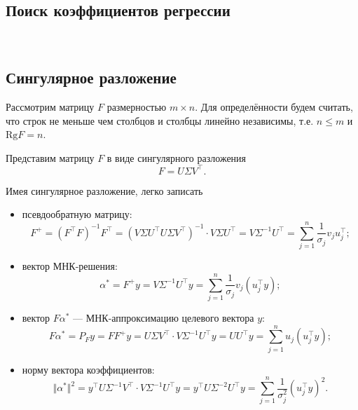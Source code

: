 \documentclass[11pt,a4paper]{article}
\begin{document}
    \hypertarget{ux43fux43eux438ux441ux43a-ux43aux43eux44dux444ux444ux438ux446ux438ux435ux43dux442ux43eux432-ux440ux435ux433ux440ux435ux441ux441ux438ux438}{%
\subsection{Поиск коэффициентов
регрессии}\label{ux43fux43eux438ux441ux43a-ux43aux43eux44dux444ux444ux438ux446ux438ux435ux43dux442ux43eux432-ux440ux435ux433ux440ux435ux441ux441ux438ux438}}


    \begin{center}
    \end{center}
    { \hspace*{\fill} \\}
    
    \hypertarget{ux441ux438ux43dux433ux443ux43bux44fux440ux43dux43eux435-ux440ux430ux437ux43bux43eux436ux435ux43dux438ux435}{%
\subsection{Сингулярное
разложение}\label{ux441ux438ux43dux433ux443ux43bux44fux440ux43dux43eux435-ux440ux430ux437ux43bux43eux436ux435ux43dux438ux435}}

Рассмотрим матрицу \(F\) размерностью \(m \times n\).
Для определённости будем считать, что строк не меньше чем столбцов и столбцы линейно
независимы, т.е. \(n \le m\) и \(\mathrm{Rg}F = n\).

Представим матрицу \(F\) в виде сингулярного разложения
\[ F = U \Sigma V^\top. \]

Имея сингулярное разложение, легко записать

\begin{itemize}
\item
  псевдообратную матрицу:
  \[ F^{+} = (F^\top F)^{-1}F^\top = (V \Sigma U^\top U \Sigma V^\top)^{-1} \cdot V \Sigma U^\top = V \Sigma^{-1}U^\top = \sum_{j=1}^n \frac{1}{{\sigma_j} }v_j u_j^\top;  \label{eq:psevdo}\tag{1} \]
\item
  вектор МНК-решения:
  \[ \alpha^* = F^{+} y  = V \Sigma^{-1}U^\top y = \sum_{j=1}^n \frac{1}{{\sigma_j}}v_j (u_j^\top y);  \label{eq:alpha-res}\tag{2} \]
\item
  вектор \(F\alpha^*\) --- МНК-аппроксимацию целевого вектора \(y\):
  \[ F\alpha^* = P_F y = FF^{+}y = U \Sigma V^\top \cdot V \Sigma^{-1}U^\top y = UU^\top y = \sum_{j=1}^n u_j (u_j^\top y);  \label{eq:F-alpha-res}\tag{3} \]
\item
  норму вектора коэффициентов:
  \[ \Vert \alpha^* \Vert^2 = y^\top U \Sigma^{-1}V^\top \cdot V \Sigma^{-1}U^\top y = y^\top U \Sigma^{-2}U^\top y = \sum_{j=1}^n \frac{1}{\sigma_j^2} (u_j^\top y)^2.  \label{eq:alpha-res-norm}\tag{4} \]
\end{itemize}
\end{document}
